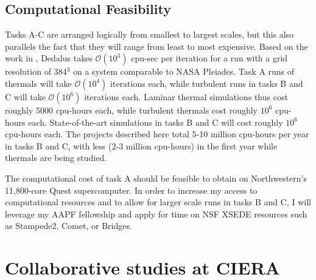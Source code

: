 \documentclass[aasms,11pt]{article}
\makeatletter
\renewcommand{\sectionmark}[1]{%
  \markboth{\ifnum \c@secnumdepth>\z@
      \thesection: \hskip 1em\relax
    \fi #1}{}}
\makeatother
\begin{document}
\subsection{Computational Feasibility}
Tasks A-C are arranged logically from smallest to largest scales, but this also parallels the fact that they will range from least to most expensive.
Based on the work in \citet{anders&brown2017, anders&all2018, anders&all2019, andersLB2019}, Dedalus takes $\mathcal{O}(10^3)$ cpu-sec per iteration for a run with a grid resolution of 384$^3$ on a system comparable to NASA Pleiades.
Task A runs of thermals will take $\mathcal{O}(10^4)$ iterations each, while turbulent runs in tasks B and C will take $\mathcal{O}(10^6)$ iterations each.
Laminar thermal simulations thus cost roughly 5000 cpu-hours each, while turbulent thermals cost roughly $10^6$ cpu-hours each.
State-of-the-art simulations in tasks B and C will cost roughly $10^6$ cpu-hours each.
The projects described here total 5-10 million cpu-hours per year in tasks B and C, with less (2-3 million cpu-hours) in the first year while thermals are being studied.

The computational cost of task A should be feasible to obtain on Northwestern's 11,800-core Quest supercomputer.
In order to increase my access to computational resources and to allow for larger scale runs in tasks B and C, I will leverage my AAPF fellowship and apply for time on NSF XSEDE resources such as Stampede2, Comet, or Bridges.


\section{Collaborative studies at CIERA}
\sectionmark{CIERA}
\vspace{-9pt}
\end{document}
